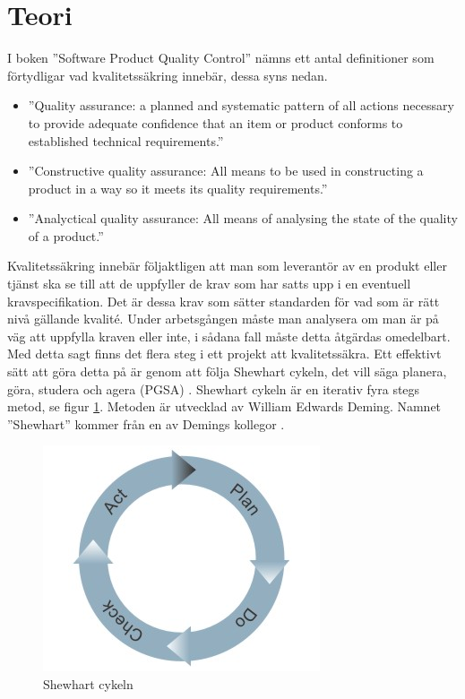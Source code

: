 \section{Teori}
I boken ''Software Product Quality Control'' \cite{SPQC} nämns ett antal definitioner som förtydligar vad kvalitetssäkring innebär, dessa syns nedan.  

\begin{itemize}
  \item ''Quality assurance: a planned and systematic pattern of all actions necessary to provide adequate confidence that an item or product conforms to established technical requirements.'' \citep[p.19]{SPQC} 
  \item ''Constructive quality assurance: All means to be used in constructing a product in a way so it meets its quality requirements.'' \citep[p.19]{SPQC} 
  \item ''Analyctical quality assurance: All means of analysing the state of the quality of a product.'' \citep[p.19]{SPQC} 
\end{itemize}
\noindent Kvalitetssäkring innebär följaktligen att man som leverantör av en produkt eller tjänst ska se till att de uppfyller de krav som har satts upp i en eventuell kravspecifikation. Det är dessa krav som sätter standarden för vad som är rätt nivå gällande kvalité. Under arbetsgången måste man analysera om man är på väg att uppfylla kraven eller inte, i sådana fall måste detta åtgärdas omedelbart.
\newline
\newline
Med detta sagt finns det flera steg i ett projekt att kvalitetssäkra. Ett effektivt sätt att göra detta på är genom att följa Shewhart cykeln, det vill säga planera, göra, studera och agera (PGSA) \citep{PDCA}. Shewhart cykeln är en iterativ fyra stegs metod, se figur \ref{fig:shewcycle}. Metoden är utvecklad av William Edwards Deming. Namnet ''Shewhart'' kommer från en av Demings kollegor \citep[p.~88]{Deming}. 
\begin{figure}[h]
\centerline{\includegraphics[scale=0.5]{ruben-tex/graphic/shewhartcycle}}
\caption{Shewhart cykeln \citep{Mindtools}}
\label{fig:shewcycle}
\end{figure}
